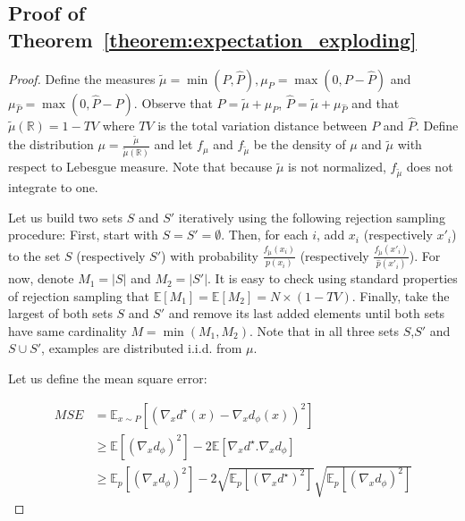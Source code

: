 \subsection{Proof of Theorem~\ref{theorem:expectation_exploding}}\label{sec:app:proofoverfitting}


\begin{proof}
    Define the measures $\tilde{\mu}=\min\left(P,\hat{P}\right),\mu_{P}=\max\left(0,P-\hat{P}\right)$
    and $\mu_{\hat{P}}=\max\left(0,\hat{P}-P\right)$. Observe that $P=\tilde{\mu}+\mu_{P}$,
    $\hat{P}=\tilde{\mu}+\mu_{\hat{P}}$ and that $\tilde{\mu}\left(\mathbb{R}\right)=1-TV$
    where $TV$ is the total variation distance between $P$ and $\hat{P}$.
    Define the distribution $\mu=\frac{\tilde{\mu}}{\tilde{\mu}(\mathbb{R})}$
    and let $f_{\mu}$ and $f_{\tilde{\mu}}$ be the density of $\mu$
    and $\tilde{\mu}$ with respect to Lebesgue measure. Note that because
    $\tilde{\mu}$ is not normalized, $f_{\tilde{\mu}}$ does not integrate
    to one.
    
    Let us build two sets $S$ and $S'$ iteratively using the following
    rejection sampling procedure: First, start with $S=S'=\emptyset$.
    Then, for each $i$, add $x_{i}$ (respectively $x'_{i}$) to the
    set $S$ (respectively $S'$) with probability $\frac{f_{\tilde{\mu}}(x_{i})}{p(x_{i})}$
    (respectively $\frac{f_{\tilde{\mu}}(x'_{i})}{\hat{p}(x'_{i})}$).
    For now, denote $M_{1}=\left|S\right|$ and $M_{2}=\left|S'\right|$.
    It is easy to check using standard properties of rejection sampling
    that $\mathbb{E}\left[M_{1}\right]=\mathbb{E}\left[M_{2}\right]=N\times(1-TV)$.
    Finally, take the largest of both sets $S$ and $S'$ and remove its
    last added elements until both sets have same cardinality $M=\min\left(M_{1},M_{2}\right)$.
    Note that in all three sets $S$,$S'$ and $S\cup S'$, examples are
    distributed i.i.d. from $\mu$.
    
    Let us define the mean square error:
    
    \begin{align*}
    MSE & =\mathbb{E}_{x\sim P}\left[\left(\nabla_{x}d^{\star}(x)-\nabla_{x}d_{\phi}(x)\right)^{2}\right]\\
     & \ge\mathbb{E}\left[\left(\nabla_{x}d_{\phi}\right)^{2}\right]-2\mathbb{E}\left[\nabla_{x}d^{\star}.\nabla_{x}d_{\phi}\right]\\
     & \ge\mathbb{E}_{p}\left[\left(\nabla_{x}d_{\phi}\right)^{2}\right]-2\sqrt{\mathbb{E}_{p}\left[\left(\nabla_{x}d^{\star}\right)^{2}\right]}\sqrt{\mathbb{E}_{p}\left[\left(\nabla_{x}d_{\phi}\right)^{2}\right]}
    \end{align*}
    

\end{proof}
